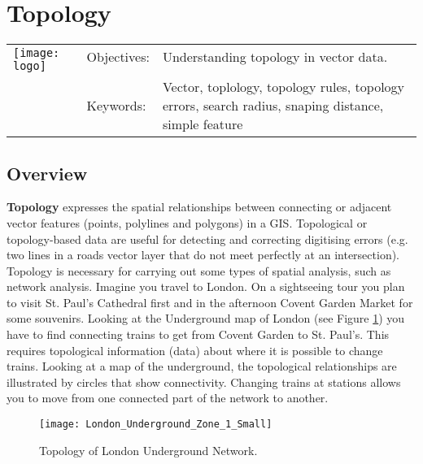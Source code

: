 

\section{Topology}\label{sec:topology}
\begin{tabular}{p{3.5cm}p{6cm}p{6cm}}
\multirow{2}{*}{\texttt{[image: logo]}} & Objectives: &
Understanding topology in vector data. \\
& & \\
& Keywords: & 
Vector, toplology, topology rules, topology errors, search radius, snaping
distance, simple feature  \\
\hline
\end{tabular}

\subsection{Overview}\label{subsec:overview}

\textbf{Topology} expresses the spatial relationships between connecting or
adjacent
vector features (points, polylines and polygons) in a GIS. Topological or
topology-based data are useful for detecting and correcting digitising errors
(e.g. two lines in a roads vector layer that do not meet perfectly at an
intersection). Topology is necessary for carrying out some types of spatial
analysis, such as network analysis. 
Imagine you travel to London. On a sightseeing tour you plan to visit St.
Paul's Cathedral first and in the afternoon Covent Garden Market for some
souvenirs. Looking at the Underground map of London (see Figure
\ref{fig:londontube}) you have to find connecting trains to get from Covent
Garden to St. Paul's. This requires topological information (data) about
where it is
possible to change trains. Looking at a map of the underground, the
topological relationships are illustrated by circles that show connectivity.
Changing trains at stations allows you to move from one connected part of the
network to another.

\begin{figure}[ht]
   \begin{center}
   \caption{Topology of London Underground Network.}
\label{fig:londontube}\smallskip
   \texttt{[image: London\_Underground\_Zone\_1\_Small]}
\end{center}
\end{figure}

